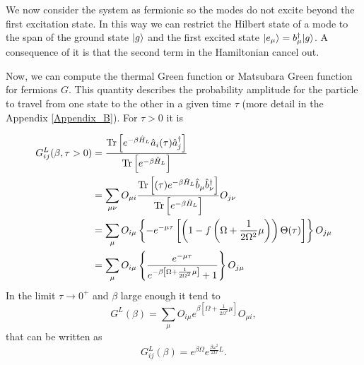 We now consider the system as fermionic so the modes do not excite beyond the first excitation state. In this way we can restrict the Hilbert state of a mode to the span of the ground state $\lvert g\rangle$ and the first excited state $\lvert e_\mu\rangle=b_\mu^\dagger\lvert g\rangle$. A consequence of it is that the second term in the Hamiltonian cancel out. 


Now, we can compute the thermal Green function or Matsubara Green function for fermions $G$. This quantity describes the probability amplitude for the particle to travel from one state to the other in a given time $\tau$ (more detail in the Appendix \ref{Appendix_B}). For $\tau > 0$ it is

\begin{equation}
    \begin{split}
        G^L_{ij}(\beta, \tau > 0) &= \frac{\operatorname{Tr}\left[e^{-\beta \hat H_L}\hat a_i (\tau)  \hat a_j^\dagger\right]}{\operatorname{Tr}\left[e^{-\beta \hat H_L}\right]} \\
        &=\sum_{\mu\nu} O_{\mu i}\frac{\operatorname{Tr}\left[ (\tau) e^{-\beta \hat H_L} \hat b_\mu\hat b_\nu^\dagger\right]}{\operatorname{Tr}\left[e^{-\beta \hat H_L}\right]}O_{j\nu}\\
        &= \sum_{\mu} O_{i\mu}\left\{-e^{-\mu \tau}\left[\left(1-f\left( \Omega + \frac{1}{2\Omega^2}\mu\right)\right)\Theta(\tau)\right]\right\}O_{j\mu}\\
        &= \sum_{\mu} O_{i\mu}\left\{\frac{e^{-\mu \tau}}{e^{-\beta\left[ \Omega + \frac{1}{2\Omega^2}\mu\right]} + 1}\right\}O_{j\mu}\\
    \end{split}
\end{equation}
In the limit $\tau \rightarrow 0^+$ and $\beta$ large enough it tend to
\begin{equation}
    G^L(\beta) = \sum_{\mu} O_{i\mu}{e^{\beta\left[ \Omega + \frac{1}{2\Omega^2}\mu\right]}} O_{\mu i},
\end{equation}
that can be written as
\begin{equation}
    G^L_{ij}(\beta)= e^{\beta \Omega}e^{\frac{\beta \omega^2}{2\Omega}L}.
\end{equation}

